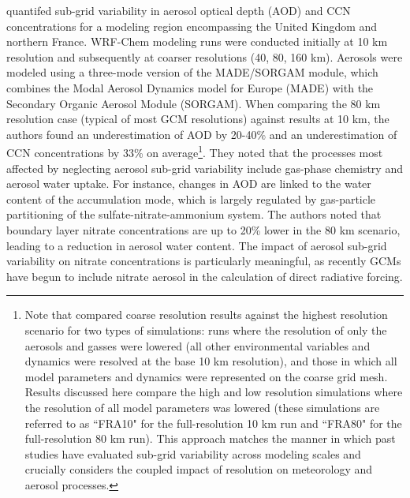 \textcite{weigum_effect_2016} quantifed sub-grid variability in aerosol optical depth (AOD) and CCN concentrations for a modeling region encompassing the United Kingdom and northern France. WRF-Chem modeling runs were conducted initially at 10 km resolution and subsequently at coarser resolutions (40, 80, 160 km). Aerosols were modeled using a three-mode version of the MADE/SORGAM module, which combines the Modal Aerosol Dynamics model for Europe (MADE) with the Secondary Organic Aerosol Module (SORGAM). When comparing the 80 km resolution case (typical of most GCM resolutions) against results at 10 km, the authors found an underestimation of AOD by 20-40\% and an underestimation of CCN concentrations by 33\% on average\footnote{Note that \textcite{weigum_effect_2016} compared coarse resolution results against the highest resolution scenario for two types of simulations: runs where the resolution of only the aerosols and gasses were lowered (all other environmental variables and dynamics were resolved at the base 10 km resolution), and those in which all model parameters and dynamics were represented on the coarse grid mesh. Results discussed here compare the high and low resolution simulations where the resolution of all model parameters was lowered (these simulations are referred to as ``FRA10" for the full-resolution 10 km run and ``FRA80" for the full-resolution 80 km run). This approach matches the manner in which past studies have evaluated sub-grid variability across modeling scales and crucially considers the coupled impact of resolution on meteorology and aerosol processes.}. They noted that the processes most affected by neglecting aerosol sub-grid variability include gas-phase chemistry and aerosol water uptake. For instance, changes in AOD are linked to the water content of the accumulation mode, which is largely regulated by gas-particle partitioning of the sulfate-nitrate-ammonium system. The authors noted that boundary layer nitrate concentrations are up to 20\% lower in the 80 km scenario, leading to a reduction in aerosol water content. The impact of aerosol sub-grid variability on nitrate concentrations is particularly meaningful, as recently GCMs have begun to include nitrate aerosol in the calculation of direct radiative forcing.

